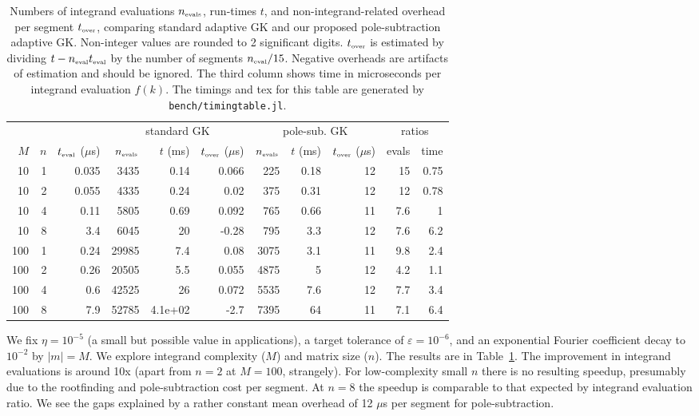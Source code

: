 \documentclass[11pt]{article}
\newcommand{\ca}[2]{\caption{#1 \label{#2}}}
\newcommand{\tbox}[1]{{\mbox{\tiny #1}}}
\newcommand{\eps}{\varepsilon}
\begin{document}
\begin{table}   %
  \centering
\begin{tabular}{r|r|r|rrr|rrr|rr|}
&&& \multicolumn{3}{c}{standard GK} & \multicolumn{3}{c}{pole-sub. GK} & \multicolumn{2}{c}{ratios}\\ 
$M$ & $n$ & $t_\tbox{eval}$ ($\mu$s) & $n_\tbox{evals}$ & $t$ (ms) & $t_\tbox{over}$ ($\mu$s) & $n_\tbox{evals}$ & $t$ (ms) & $t_\tbox{over}$ ($\mu$s) & evals & time\\ 
\hline
10 & 1 & 0.035 & 3435 & 0.14 & 0.066 & 225 & 0.18 & 12 & 15 & 0.75\\ 
10 & 2 & 0.055 & 4335 & 0.24 & 0.02 & 375 & 0.31 & 12 & 12 & 0.78\\ 
10 & 4 & 0.11 & 5805 & 0.69 & 0.092 & 765 & 0.66 & 11 & 7.6 & 1\\ 
10 & 8 & 3.4 & 6045 & 20 & -0.28 & 795 & 3.3 & 12 & 7.6 & 6.2\\ 
\hline
100 & 1 & 0.24 & 29985 & 7.4 & 0.08 & 3075 & 3.1 & 11 & 9.8 & 2.4\\ 
100 & 2 & 0.26 & 20505 & 5.5 & 0.055 & 4875 & 5 & 12 & 4.2 & 1.1\\ 
100 & 4 & 0.6 & 42525 & 26 & 0.072 & 5535 & 7.6 & 12 & 7.7 & 3.4\\ 
100 & 8 & 7.9 & 52785 & 4.1e+02 & -2.7 & 7395 & 64 & 11 & 7.1 & 6.4\\ 

\hline
\end{tabular}
\ca{Numbers of integrand evaluations $n_\tbox{evals}$, run-times $t$,
  and non-integrand-related overhead per segment $t_\tbox{over}$, comparing
  standard adaptive GK and our proposed pole-subtraction adaptive GK.
  Non-integer values are rounded to 2 significant digits.
  $t_\tbox{over}$ is estimated by dividing $t - n_\tbox{eval}t_\tbox{eval}$ by
  the number of segments $n_\tbox{eval}/15$.
  Negative overheads are artifacts of estimation and should be ignored.
  The third column shows time in microseconds per integrand evaluation $f(k)$.
The timings and tex for this table are generated by {\tt bench/timingtable.jl}.
}{t:time}
\end{table}

We fix $\eta=10^{-5}$ (a small but possible value in applications),
a target tolerance of $\eps=10^{-6}$,
and an exponential Fourier coefficient decay to $10^{-2}$ by $|m|=M$.
We explore integrand complexity ($M$) and matrix size ($n$).
The results are in Table~\ref{t:time}.
The improvement in integrand evaluations is around 10x (apart from $n=2$ at $M=100$,
strangely).
For low-complexity small $n$ there is no resulting speedup, presumably
due to the rootfinding and pole-subtraction cost per segment.
At $n=8$ the speedup is comparable to that expected by integrand evaluation ratio.
We see the gaps explained by a rather constant mean overhead of 12 $\mu$s per segment
for pole-subtraction.
\end{document}
